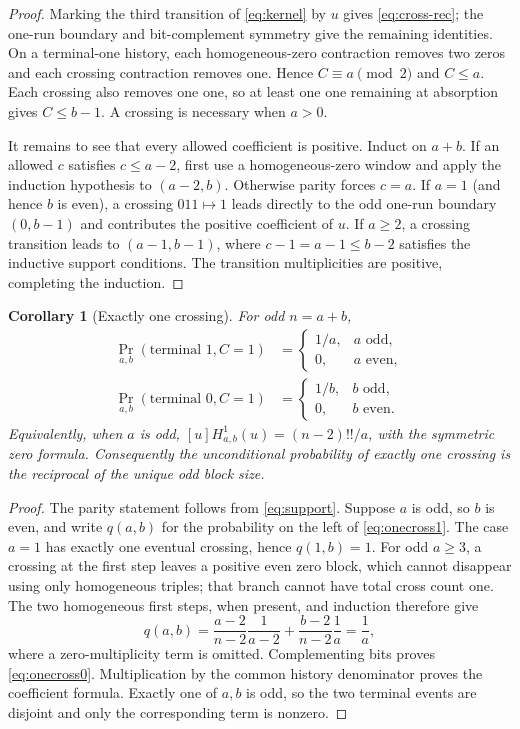 \documentclass[10pt,a4paper]{amsart}
\newtheorem{corollary}[theorem]{Corollary}
\theoremstyle{remark}
\newcommand{\1}{\mathbf 1}
\begin{document}
\begin{proof}
Marking the third transition of \eqref{eq:kernel} by $u$ gives
\eqref{eq:cross-rec}; the one-run boundary and bit-complement symmetry give
the remaining identities.  On a terminal-one history, each homogeneous-zero
contraction removes two zeros and each crossing contraction removes one.
Hence $C\equiv a\pmod2$ and $C\leq a$.  Each crossing also removes one one,
so at least one one remaining at absorption gives $C\leq b-1$.  A crossing is
necessary when $a>0$.

It remains to see that every allowed coefficient is positive.  Induct on
$a+b$.  If an allowed $c$ satisfies $c\leq a-2$, first use a homogeneous-zero
window and apply the induction hypothesis to $(a-2,b)$.  Otherwise parity
forces $c=a$.  If $a=1$ (and hence $b$ is even), a crossing $011\mapsto1$
leads directly to the odd one-run boundary $(0,b-1)$ and contributes the
positive coefficient of $u$.  If $a\geq2$, a crossing transition leads to
$(a-1,b-1)$, where $c-1=a-1\leq b-2$ satisfies the inductive support
conditions.  The transition multiplicities are positive, completing the
induction.
\end{proof}

\begin{corollary}[Exactly one crossing]\label{cor:one-cross}
For odd $n=a+b$,
\begin{align}
 \Pr_{a,b}(\text{terminal }1,C=1)
 &=\begin{cases}1/a,&a\text{ odd},\\0,&a\text{ even},\end{cases}\label{eq:onecross1}\\
 \Pr_{a,b}(\text{terminal }0,C=1)
 &=\begin{cases}1/b,&b\text{ odd},\\0,&b\text{ even}.
 \end{cases}\label{eq:onecross0}
\end{align}
Equivalently, when $a$ is odd,
$[u]H^1_{a,b}(u)=(n-2)!!/a$, with the symmetric zero formula.  Consequently
the unconditional probability of exactly one crossing is the reciprocal of
the unique odd block size.
\end{corollary}

\begin{proof}
The parity statement follows from \eqref{eq:support}.  Suppose $a$ is odd,
so $b$ is even, and write $q(a,b)$ for the probability on the left of
\eqref{eq:onecross1}.  The case $a=1$ has exactly one eventual crossing, hence
$q(1,b)=1$.  For odd $a\geq3$, a crossing at the first step leaves a positive
even zero block, which cannot disappear using only homogeneous triples; that
branch cannot have total cross count one.  The two homogeneous first steps,
when present, and induction therefore give
\[
q(a,b)=\frac{a-2}{n-2}\frac1{a-2}
       +\frac{b-2}{n-2}\frac1a=\frac1a,
\]
where a zero-multiplicity term is omitted.  Complementing bits proves
\eqref{eq:onecross0}.  Multiplication by the common history denominator proves
the coefficient formula.  Exactly one of $a,b$ is odd, so the two terminal
events are disjoint and only the corresponding term is nonzero.
\end{proof}
\end{document}
